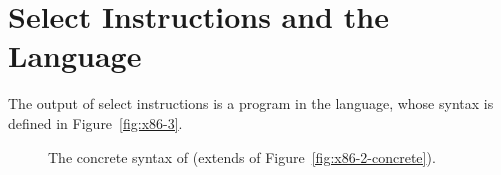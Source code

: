 \documentclass[7x10]{TimesAPriori_MIT}%
\newcommand{\gray}[1]{{\color{gray} #1}}
\begin{document}
\section{Select Instructions and the \LangXIndCall{} Language}
\label{sec:select-r4}

The output of select instructions is a program in the \LangXIndCall{}
language, whose syntax is defined in Figure~\ref{fig:x86-3}.

\begin{figure}[tp]
\fbox{
\begin{minipage}{0.96\textwidth}
\small
\[
\begin{array}{lcl}
  \Arg &::=& \gray{ \key{\$}\Int \MID \key{\%}\Reg \MID \Int\key{(}\key{\%}\Reg\key{)} \MID \key{\%}\itm{bytereg} } \MID \Var \key{(\%rip)} \\
\itm{cc} & ::= & \gray{  \key{e} \MID \key{l} \MID \key{le} \MID \key{g} \MID \key{ge}  } \\
\Instr &::=& \ldots
     \MID \key{callq}\;\key{*}\Arg \MID \key{tailjmp}\;\Arg 
     \MID \key{leaq}\;\Arg\key{,}\;\key{\%}\Reg \\
\Block &::= & \Instr\ldots \\
\Def &::= & \LP\key{define} \; \LP\itm{label}\RP \;\LP\LP\itm{label} \,\key{.}\, \Block\RP\ldots\RP\RP\\
\LangXIndCallM{} &::= & \Def\ldots
\end{array}
\]
\end{minipage}
}
\caption{The concrete syntax of \LangXIndCall{} (extends \LangXGlobal{} of Figure~\ref{fig:x86-2-concrete}).}
\label{fig:x86-3-concrete}
\end{figure}
\end{document}

